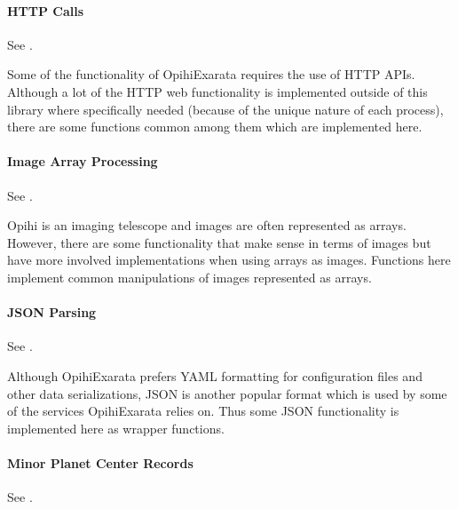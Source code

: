 \documentclass[letterpaper,11pt,english]{sphinxmanual}
\begin{document}
\paragraph{HTTP Calls}
\label{\detokenize{technical/architecture/library:http-calls}}
\sphinxAtStartPar
See {\hyperref[\detokenize{code/opihiexarata.library.http:module-opihiexarata.library.http}]{}}.

\sphinxAtStartPar
Some of the functionality of OpihiExarata requires the use of HTTP APIs.
Although a lot of the HTTP web functionality is implemented outside of this
library where specifically needed (because of the unique nature of each
process), there are some functions common among them which are implemented
here.


\paragraph{Image Array Processing}
\label{\detokenize{technical/architecture/library:image-array-processing}}
\sphinxAtStartPar
See {\hyperref[\detokenize{code/opihiexarata.library.image:module-opihiexarata.library.image}]{}}.

\sphinxAtStartPar
Opihi is an imaging telescope and images are often represented as arrays.
However, there are some functionality that make sense in terms of images but
have more involved implementations when using arrays as images. Functions
here implement common manipulations of images represented as arrays.


\paragraph{JSON Parsing}
\label{\detokenize{technical/architecture/library:json-parsing}}
\sphinxAtStartPar
See {\hyperref[\detokenize{code/opihiexarata.library.json:module-opihiexarata.library.json}]{}}.

\sphinxAtStartPar
Although OpihiExarata prefers YAML formatting for configuration files and
other data serializations, JSON is another popular format which is used by
some of the services OpihiExarata relies on. Thus some JSON functionality
is implemented here as wrapper functions.


\paragraph{Minor Planet Center Records}
\label{\detokenize{technical/architecture/library:minor-planet-center-records}}
\sphinxAtStartPar
See {\hyperref[\detokenize{code/opihiexarata.library.mpcrecord:module-opihiexarata.library.mpcrecord}]{}}.
\end{document}
